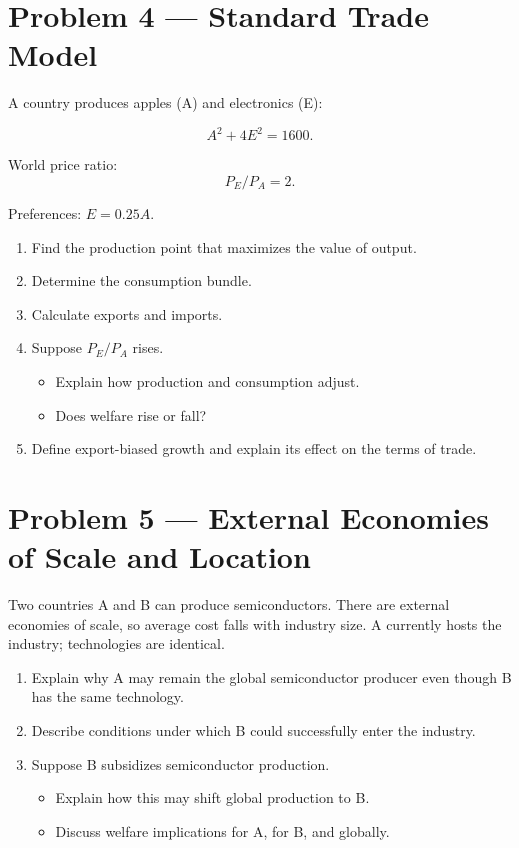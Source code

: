 \documentclass[12pt]{article}
\begin{document}

\section*{Problem 4 — Standard Trade Model}

A country produces apples (A) and electronics (E):

\[
A^2 + 4E^2 = 1600.
\]

World price ratio:
\[
P_E/P_A = 2.
\]

Preferences: $E = 0.25A$.

\begin{enumerate}[label=(\arabic*)]
\item Find the production point that maximizes the value of output.
\item Determine the consumption bundle.
\item Calculate exports and imports.
\item Suppose $P_E/P_A$ rises.
    \begin{itemize}
        \item Explain how production and consumption adjust.
        \item Does welfare rise or fall?
    \end{itemize}
\item Define export-biased growth and explain its effect on the terms of trade.
\end{enumerate}


\section*{Problem 5 — External Economies of Scale and Location}

Two countries A and B can produce semiconductors. There are external economies of scale, so average cost falls with industry size. A currently hosts the industry; technologies are identical.

\begin{enumerate}[label=(\arabic*)]
\item Explain why A may remain the global semiconductor producer even though B has the same technology.
\item Describe conditions under which B could successfully enter the industry.
\item Suppose B subsidizes semiconductor production.
    \begin{itemize}
        \item Explain how this may shift global production to B.
        \item Discuss welfare implications for A, for B, and globally.
    \end{itemize}
\end{enumerate}
\end{document}
